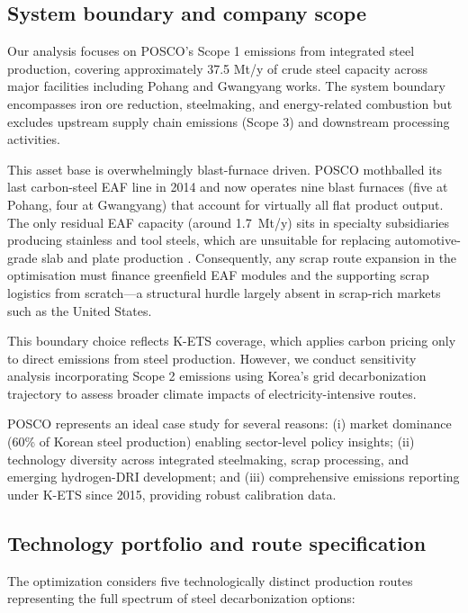 \documentclass[preprint,1p,authoryear]{elsarticle}
\begin{document}
\subsection{System boundary and company scope}

Our analysis focuses on POSCO's Scope 1 emissions from integrated steel production, covering approximately 37.5 Mt/y of crude steel capacity across major facilities including Pohang and Gwangyang works. The system boundary encompasses iron ore reduction, steelmaking, and energy-related combustion but excludes upstream supply chain emissions (Scope 3) and downstream processing activities.

This asset base is overwhelmingly blast-furnace driven. POSCO mothballed its last carbon-steel EAF line in 2014 and now operates nine blast furnaces (five at Pohang, four at Gwangyang) that account for virtually all flat product output. The only residual EAF capacity (around 1.7~Mt/y) sits in specialty subsidiaries producing stainless and tool steels, which are unsuitable for replacing automotive-grade slab and plate production \citep{POSCO2023SR,KOSA2024Yearbook}. Consequently, any scrap route expansion in the optimisation must finance greenfield EAF modules and the supporting scrap logistics from scratch—a structural hurdle largely absent in scrap-rich markets such as the United States.

This boundary choice reflects K-ETS coverage, which applies carbon pricing only to direct emissions from steel production. However, we conduct sensitivity analysis incorporating Scope 2 emissions using Korea's grid decarbonization trajectory to assess broader climate impacts of electricity-intensive routes.

POSCO represents an ideal case study for several reasons: (i) market dominance (60\% of Korean steel production) enabling sector-level policy insights; (ii) technology diversity across integrated steelmaking, scrap processing, and emerging hydrogen-DRI development; and (iii) comprehensive emissions reporting under K-ETS since 2015, providing robust calibration data.

\subsection{Technology portfolio and route specification}

The optimization considers five technologically distinct production routes representing the full spectrum of steel decarbonization options:
\end{document}

